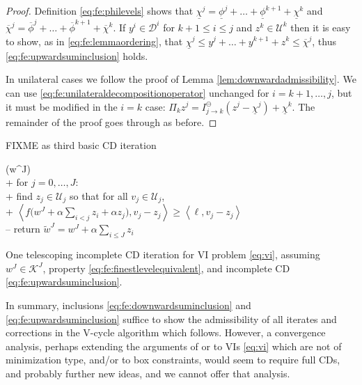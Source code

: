 \documentclass[letterpaper,final,12pt,reqno]{amsart}
\theoremstyle{cstyle}
\theoremstyle{cstyle*}
\theoremstyle{dstyle}
\numberwithin{equation}{section}
\numberwithin{figure}{section}
\numberwithin{table}{section}
\numberwithin{theorem}{section}
\newcommand{\ip}[2]{\left<#1,#2\right>}
\begin{document}
\begin{proof}  Definition \eqref{eq:fe:philevels} shows that $\underline{\chi}^j = \underline{\phi}^j + \dots + \underline{\phi}^{k+1} + \underline{\chi}^k$ and $\overline{\chi}^j = \overline{\phi}^j + \dots + \overline{\phi}^{k+1} + \overline{\chi}^k$.  If $y^i \in \mathcal{D}^i$ for $k+1 \le i \le j$ and $z^k \in \mathcal{U}^k$ then it is easy to show, as in \eqref{eq:fe:lemmaordering}, that $\underline{\chi}^j \le y^j + \dots + y^{k+1} + z^k \le \overline{\chi}^j$, thus \eqref{eq:fe:upwardsuminclusion} holds.

In unilateral cases we follow the proof of Lemma \ref{lem:downwardadmissibility}.  We can use \eqref{eq:fe:unilateraldecompositionoperator} unchanged for $i=k+1,\dots,j$, but it must be modified in the $i=k$ case: $\Pi_k z^j = I_{j\to k}^\ominus(z^j - \underline{\chi}^j) + \underline{\chi}^k$.  The remainder of the proof goes through as before.
\end{proof}

FIXME  as third basic CD iteration


\begin{pseudofloat}[H]
\begin{pseudo*}
(w^J)\text{:} \\+
    for $j = 0,\dots,J$: \\+
        \rm{find} $z_j\in \mathcal{U}_j$ \rm{so that for all} $v_j\in \mathcal{U}_j$, \\+
            $\displaystyle \ip{f\Big(w^J + \alpha \sum_{i<j} z_i + \alpha z_j\Big)}{v_j-z_j} \ge \ip{\ell}{v_j-z_j}$ \\--
    return $\tilde w^J=w^J + \alpha \sum_{i\le J} z_i$
\end{pseudo*}
\caption{One telescoping incomplete CD iteration for VI problem \eqref{eq:vi}, assuming $w^J\in\mathcal{K}^J$, property \eqref{eq:fe:finestlevelequivalent}, and incomplete CD \eqref{eq:fe:upwardsuminclusion}.}
\label{alg:basiccd-tele}
\end{pseudofloat}

In summary, inclusions \eqref{eq:fe:downwardsuminclusion} and \eqref{eq:fe:upwardsuminclusion} suffice to show the admissibility of all iterates and corrections in the V-cycle algorithm which follows.  However, a convergence analysis, perhaps extending the arguments of \cite{Tai2003} or \cite{GraeserKornhuber2009} to VIs \eqref{eq:vi} which are not of minimization type, and/or to box constraints, would seem to require full CDs, and probably further new ideas, and we cannot offer that analysis.
\end{document}
